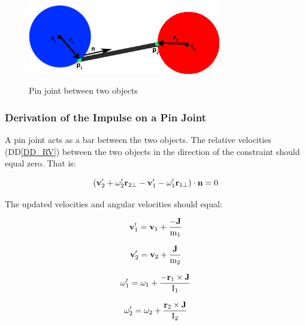 \documentclass[12pt]{article}
\begin{document}
\begin{figure}[h!]
\begin{center}
{
 \includegraphics[width=0.75\textwidth]{pictures/pinJoint.png}
}
\caption{\label{Fig_pinJoint}Pin joint between two objects}
\end{center}
\end{figure}

\subsubsection{Derivation of the Impulse on a Pin Joint}
A pin joint acts as a bar between the two objects. The relative velocities 
(DD\ref{DD_RV})
between the two objects in the direction of the constraint 
should equal zero. That is:

\begin{equation}
(\textbf v'_\text{2} + \omega'_\text{2}\textbf r_\text{2$\perp$} - \textbf
v'_\text{1} - \omega'_\text{1}\textbf r_\text{1$\perp$}) \cdot \textbf n = 0
\label{eq:rv}
\end{equation}

\noindent
The updated velocities and angular velocities should equal:

\begin{equation*}
\bf v'_\text{1} =  v_\text{1} + \frac{-J}{ \textnormal m_\text{1}}
\end{equation*}

\begin{equation*}
\bf v'_\text{2} =  v_\text{2} + \frac{J}{ \textnormal m_\text{2}}
  \end{equation*}
  
\begin{equation*}
\bf \omega'_\text{1} = \omega_\text{1} + \frac{-r_\text{1} \times J}{\textnormal
I_\text{1}}
  \end{equation*}
  
\begin{equation*}
\bf \omega'_\text{2} = \omega_\text{2} + \frac{r_\text{2} \times J}{\textnormal
I_\text{2}}
  \end{equation*}
\end{document}
